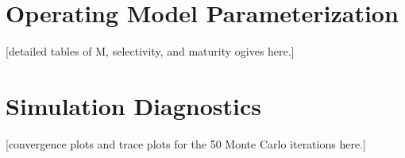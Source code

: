 \documentclass[
  authoryear,
  preprint,
  3p]{elsarticle}
\begin{document}
\renewcommand{\bibsection}{}


\newpage{}

\section{Operating Model
Parameterization}\label{operating-model-parameterization}

{[}detailed tables of M, selectivity, and maturity ogives here.{]}

\section{Simulation Diagnostics}\label{simulation-diagnostics}

{[}convergence plots and trace plots for the 50 Monte Carlo iterations
here.{]}
\end{document}
